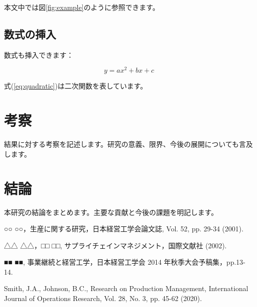 \documentclass[10.5pt,twocolumn]{ltjsarticle}
\begin{document}
本文中では図\ref{fig:example}のように参照できます。

\subsection{数式の挿入}
数式も挿入できます：

\begin{equation}
y = ax^2 + bx + c
\label{eq:quadratic}
\end{equation}

式(\ref{eq:quadratic})は二次関数を表しています。

\section{考察}
結果に対する考察を記述します。研究の意義、限界、今後の展開についても言及します。

\section{結論}
本研究の結論をまとめます。主要な貢献と今後の課題を明記します。

\begin{thebibliography}{9}
○○ ○○，生産に関する研究，日本経営工学会論文誌, Vol. 52, pp. 29-34 (2001).

△△ △△，□□ □□, サプライチェインマネジメント，国際文献社 (2002).

■■ ■■, 事業継続と経営工学，日本経営工学会 2014 年秋季大会予稿集，pp.13-14.

Smith, J.A., Johnson, B.C., Research on Production Management, International Journal of Operations Research, Vol. 28, No. 3, pp. 45-62 (2020).
\end{thebibliography}
\end{document}
